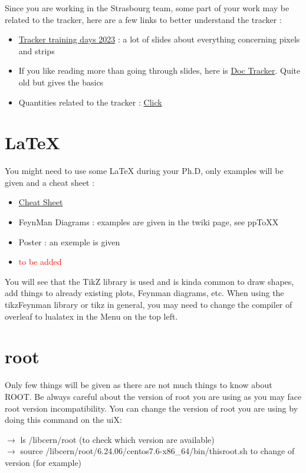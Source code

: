 \documentclass[reprint, a4paper, nofootinbib, amsmath, amssymb, aps]{revtex4-1}
\begin{document}
    Since you are working in the Strasbourg team, some part of your work may be related to the tracker, here are a few links to better understand the tracker :
    \begin{itemize}
        \item \href{https://indico.cern.ch/event/1238081/timetable/#20230227}{Tracker training days 2023} : a lot of slides about everything concerning pixels and strips
        \item If you like reading more than going through slides, here is \href{https://cds.cern.ch/record/914891/files/jpconf6_41_011.pdf}{Doc Tracker}. Quite old but gives the basics
        \item Quantities related to the tracker : \href{http://cms.cern.ch/iCMS/jsp/openfile.jsp?type=DN&year=2020&files=DN2020_004.pdf}{Click}
    \end{itemize}
    
\section{LaTeX}
    You might need to use some LaTeX during your Ph.D, only examples will be given and a cheat sheet :
    \begin{itemize}
        \item \href{https://wch.github.io/latexsheet/}{Cheat Sheet}
        \item FeynMan Diagrams : examples are given in the twiki page, see ppToXX 
        \item Poster : an exemple is given 
        \item  \textcolor{red}{to be added}
    \end{itemize}

    You will see that the TikZ library is used and is kinda common to draw shapes, add things to already existing plots, Feynman diagrams, etc. When using the tikzFeynman library or tikz in general, you may need to change the compiler of overleaf to lualatex in the Menu on the top left.
\section{root}

 Only few things will be given as there are not much things to know  about ROOT.
 Be always careful about the version of root you are using as you may face root version incompatibility. You can change the version of root you are using by doing this command  on the uiX: \\
 \begin{center}
     $\rightarrow$ ls  /libcern/root (to check which version are available) \\
     $\rightarrow$ source /libcern/root/6.24.06/centos7.6-x86\_64/bin/thisroot.sh to change of version (for example)
 \end{center}
 
\end{document}
